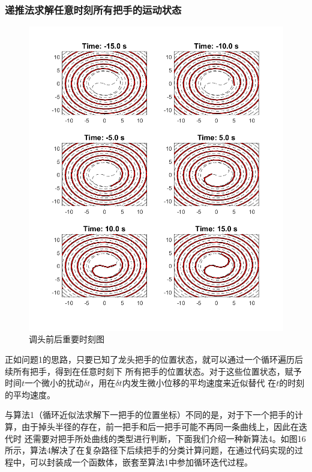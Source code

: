 \documentclass{cumcmthesis1}
\begin{document}
\subsubsection{递推法求解任意时刻所有把手的运动状态}
\begin{figure}[hp]
    \caption{调头前后重要时刻图}
    \centering    
    \includegraphics[width=0.79\linewidth]{drawing_5.4.4.2.png}
\end{figure}
正如问题1的思路，只要已知了龙头把手的位置状态，就可以通过一个循环遍历后续所有把手，得到在任意时刻下
所有把手的位置状态。对于这些位置状态，赋予时间$t$一个微小的扰动$\delta t$，用在$\delta t$内发生微小位移的平均速度来近似替代
在$t$的时刻的平均速度。
\par
与算法1（循环近似法求解下一把手的位置坐标）不同的是，对于下一个把手的计算，由于掉头半径的存在，前一把手和后一把手可能不再同一条曲线上，因此在迭代时
还需要对把手所处曲线的类型进行判断，下面我们介绍一种新算法4。如图16所示，算法4解决了在复杂路径下后续把手的分类计算问题，在通过代码实现的过程中，可以封装成一个函数体，嵌套至算法1中参加循环迭代过程。
\end{document}
